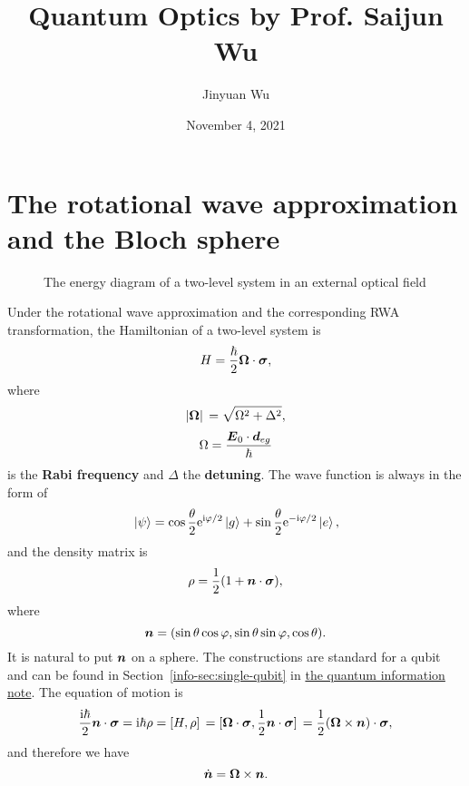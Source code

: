 \documentclass[hyperref, a4paper]{article}
\title{Quantum Optics by Prof. Saijun Wu}
\author{Jinyuan Wu}
\date{November 4, 2021}
\newcommand*{\ii}{\mathrm{i}}
\newcommand*{\ee}{\mathrm{e}}
\newcommand*{\concept}[1]{{\textbf{#1}}}
\newcommand{\infodoc}{\href{../information/quantum-circuit}{the quantum information note}}
\begin{document}
\maketitle

\section{The rotational wave approximation and the Bloch sphere}

\begin{figure}
    \centering
    
    \caption{The energy diagram of a two-level system in an external optical field}
\end{figure}

Under the rotational wave approximation and the corresponding RWA transformation, the Hamiltonian of a two-level system is 
\begin{equation}
    H = \frac{\hbar}{2} \vb*{\Omega} \cdot \vb*{\sigma},
\end{equation}
where 
\begin{equation}
    \abs*{\vb*{\Omega}} = \sqrt{\Omega^2 + \Delta^2},
\end{equation}
\begin{equation}
    \Omega = \frac{\vb*{E}_0 \cdot \vb*{d}_{eg}}{\hbar}
\end{equation}
is the \concept{Rabi frequency} and $\Delta$ the \concept{detuning}.
The wave function is always in the form of 
\begin{equation}
    \ket*{\psi} = \cos \frac{\theta}{2} \ee^{\ii \varphi /2 } \ket*{g} + \sin \frac{\theta}{2} \ee^{- \ii \varphi / 2} \ket*{e}, 
\end{equation}
and the density matrix is 
\begin{equation}
    \rho = \frac{1}{2} (1 + \vb*{n} \cdot \vb*{\sigma}),
\end{equation}
where 
\begin{equation}
    \vb*{n} = (\sin \theta \cos \varphi, \sin \theta \sin \varphi, \cos \theta).
\end{equation}
It is natural to put $\vb*{n}$ on a sphere.
The constructions are standard for a qubit and can be found in Section~\ref{info-sec:single-qubit} in \infodoc.
The equation of motion is 
\[
    \frac{\ii \hbar}{2} \vb*{n} \cdot \vb*{\sigma} = \ii \hbar \rho = \comm*{H}{\rho} = \comm*{\vb*{\Omega} \cdot \vb*{\sigma}}{\frac{1}{2} \vb*{n} \cdot \vb*{\sigma}} = \frac{1}{2} (\vb*{\Omega} \times \vb*{n}) \cdot \vb*{\sigma},
\]
and therefore we have 
\begin{equation}
    \dot{\vb*{n}} = \vb*{\Omega} \times \vb*{n}. 
\end{equation}
\end{document}
